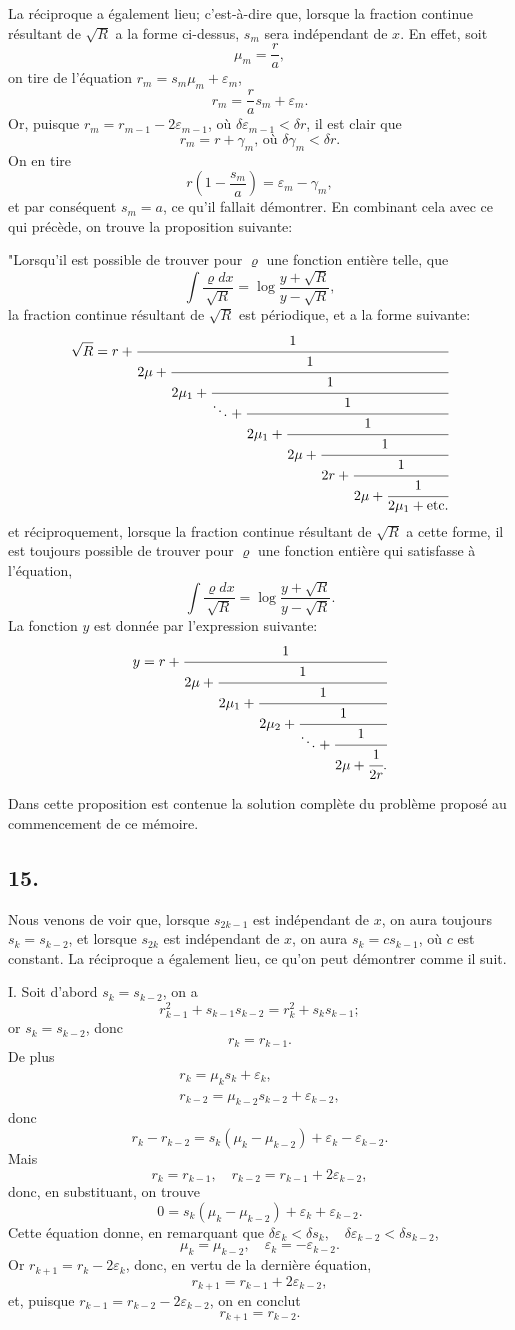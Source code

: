 \documentclass[oneside, 12 pt, leqno]{memoir}
\begin{document}
La réciproque a également lieu; c'est-à-dire que, lorsque la fraction continue résultant de \(\sqrt{R}\) a la forme ci-dessus, \(s_m\) sera indépendant de \(x\). En effet, soit
\[\mu_m=\frac{r}{a} ,\]
on tire de l'équation \(r_m=s_m \mu_m+\varepsilon_m\),
\[r_m=\frac{r}{a} s_m+\varepsilon_m.\]
Or, puisque \(r_m=r_{m-1}-2 \varepsilon_{m-1}\), où \(\delta \varepsilon_{m-1} < \delta r\), il est clair que
\[r_m=r+\gamma_m \text {, où } \delta \gamma_m<\delta r.\]
On en tire
\[r\left(1-\frac{s_m}{a}\right)=\varepsilon_m-\gamma_m,\]
et par conséquent \(s_m=a\), ce qu’il fallait démontrer. En combinant cela avec ce qui précède, on trouve la proposition suivante:

"Lorsqu'il est possible de trouver pour \(\varrho\) une fonction entière telle, que
\[\int \frac{\varrho d x}{\sqrt{R}}=\log \frac{y+\sqrt{R}}{y-\sqrt{R}},\]
la fraction continue résultant de \(\sqrt{R}\) est périodique, et a la forme suivante:
\[\sqrt{R}=r+\cfrac{1}{2 \mu+\cfrac{1}{2 \mu_1+\cfrac{1}{\ddots +\cfrac{1}{2 \mu_1+\cfrac{1}{2 \mu+\cfrac{1}{2 r+\cfrac{1}{2 \mu +\cfrac{1}{2 \mu_1+\text {etc.}}}}}}}}}\]
et réciproquement, lorsque la fraction continue résultant de \(\sqrt{R}\) a cette forme, il est toujours possible de trouver pour \(\varrho\) une fonction entière qui satisfasse à l'équation,
\[\int \frac{\varrho d x}{\sqrt{R}}=\log \frac{y+\sqrt{R}}{y-\sqrt{R}}.\]
La fonction \(y\) est donnée par l'expression suivante:
\[y=r+\cfrac{1}{2 \mu+\cfrac{1}{2 \mu_1+\cfrac{1}{2 \mu_2+\cfrac{1}{\ddots +\cfrac{1}{2 \mu+\cfrac{1}{2 r}.}}}}}\]

Dans cette proposition est contenue la solution complète du problème proposé au commencement de ce mémoire.

\subsection*{15.}

Nous venons de voir que, lorsque \(s_{2 k-1}\) est indépendant de \(x\), on aura toujours \(s_k=s_{k-2}\), et lorsque \(s_{2 k}\) est indépendant de \(x\), on aura \(s_k=c s_{k-1}\), où \(c\) est constant. La réciproque a également lieu, ce qu'on peut démontrer comme il suit.

I. Soit d'abord \(s_k=s_{k-2}\), on a
\[r_{k-1}^2+s_{k-1} s_{k-2}=r_k^2+s_k s_{k-1};\]
or \(s_k=s_{k-2}\), donc
\[r_k=r_{k-1}.\]
De plus
\[\begin{gathered}
r_k=\mu_k s_k+\varepsilon_k, \\
r_{k-2}=\mu_{k-2} s_{k-2}+\varepsilon_{k-2},
\end{gathered}\]
donc
\[r_k-r_{k-2}=s_k\left(\mu_k-\mu_{k-2}\right)+\varepsilon_k-\varepsilon_{k-2}.\]
Mais
\[r_k=r_{k-1}, \quad r_{k-2}=r_{k-1}+2 \varepsilon_{k-2},\]
donc, en substituant, on trouve
\[0=s_k\left(\mu_k-\mu_{k-2}\right)+\varepsilon_k+\varepsilon_{k-2}.\]
Cette équation donne, en remarquant que \(\delta \varepsilon_k<\delta s_k, \quad \delta \varepsilon_{k-2}<\delta s_{k-2}\),
\[\mu_k=\mu_{k-2}, \quad \varepsilon_k=-\varepsilon_{k-2}.\]
Or \(r_{k+1}=r_k-2 \varepsilon_k\), donc, en vertu de la dernière équation,
\[r_{k+1}=r_{k-1}+2 \varepsilon_{k-2},\]
et, puisque \(r_{k-1}=r_{k-2}-2 \varepsilon_{k-2}\), on en conclut
\[r_{k+1}=r_{k-2}.\]
\end{document}
